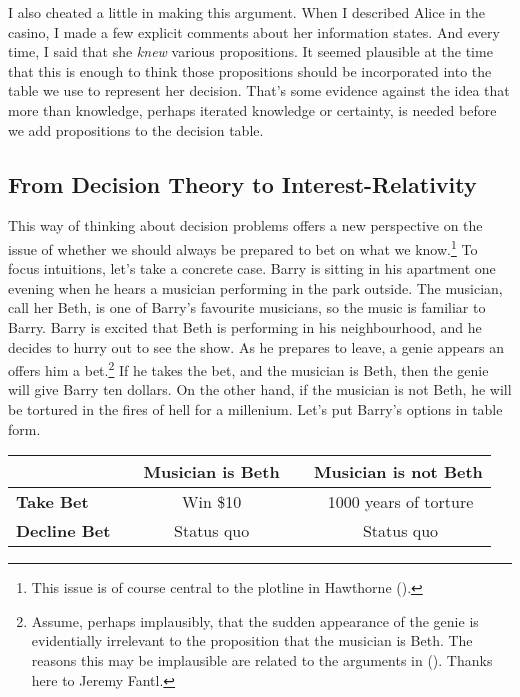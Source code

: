 \documentclass[
  11pt,
  letterpaper,
  DIV=11,
  numbers=noendperiod,
  twoside]{scrartcl}
\begin{document}
I also cheated a little in making this argument. When I described Alice
in the casino, I made a few explicit comments about her information
states. And every time, I said that she \emph{knew} various
propositions. It seemed plausible at the time that this is enough to
think those propositions should be incorporated into the table we use to
represent her decision. That's some evidence against the idea that more
than knowledge, perhaps iterated knowledge or certainty, is needed
before we add propositions to the decision table.

\subsection{From Decision Theory to
Interest-Relativity}\label{from-decision-theory-to-interest-relativity}

This way of thinking about decision problems offers a new perspective on
the issue of whether we should always be prepared to bet on what we
know.\footnote{This issue is of course central to the plotline in
  Hawthorne ().} To focus intuitions,
let's take a concrete case. Barry is sitting in his apartment one
evening when he hears a musician performing in the park outside. The
musician, call her Beth, is one of Barry's favourite musicians, so the
music is familiar to Barry. Barry is excited that Beth is performing in
his neighbourhood, and he decides to hurry out to see the show. As he
prepares to leave, a genie appears an offers him a bet.\footnote{Assume,
  perhaps implausibly, that the sudden appearance of the genie is
  evidentially irrelevant to the proposition that the musician is Beth.
  The reasons this may be implausible are related to the arguments in
  (). Thanks here to
  Jeremy Fantl.} If he takes the bet, and the musician is Beth, then the
genie will give Barry ten dollars. On the other hand, if the musician is
not Beth, he will be tortured in the fires of hell for a millenium.
Let's put Barry's options in table form.

\begin{longtable}[]{@{}lcc@{}}
\toprule\noalign{}
~ & ~\textbf{Musician is Beth}~ & ~\textbf{Musician is not Beth} \\
\midrule\noalign{}
\endhead
\bottomrule\noalign{}
\endlastfoot
\textbf{Take Bet} ~ & ~ Win \$10 ~ & ~ 1000 years of torture \\
\textbf{Decline Bet}~ & ~ Status quo ~ & ~ Status quo \\
\end{longtable}
\end{document}
